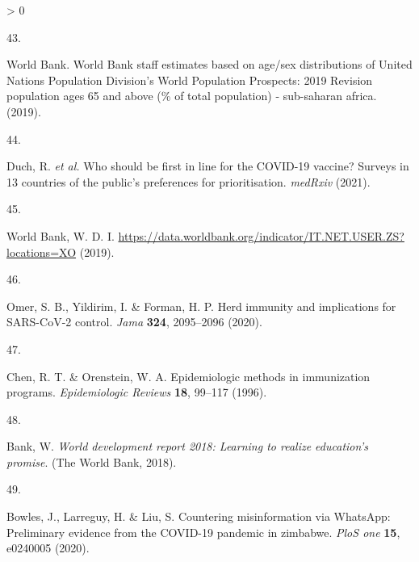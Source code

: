 \documentclass[
  12pt,
]{article}
\newlength{\cslhangindent}
\newlength{\csllabelwidth}
\newenvironment{CSLReferences}[2] %
 {%
  \setlength{\parindent}{0pt}
  \ifodd #1 \everypar{\setlength{\hangindent}{\cslhangindent}}\ignorespaces\fi
  \ifnum #2 > 0
  \setlength{\parskip}{#2\baselineskip}
  \fi
 }%
 {}
\newcommand{\CSLLeftMargin}[1]{\parbox[t]{\csllabelwidth}{#1}}
\newcommand{\CSLRightInline}[1]{\parbox[t]{\linewidth - \csllabelwidth}{#1}\break}
\providecommand{\DIFaddbegin}{} %
\providecommand{\DIFaddend}{} %
\providecommand{\DIFdelbegin}{} %
\providecommand{\DIFdelend}{} %
\newcommand{\DIFscaledelfig}{0.5}
\newlength{\DIFdelgraphicswidth} %
\newlength{\DIFdelgraphicsheight} %
\newcommand{\DIFaddincludegraphics}[2][]{{\color{blue}\fbox{\DIFOincludegraphics[#1]{#2}}}} %
\newcommand{\DIFdelincludegraphics}[2][]{%
\sbox{\DIFdelgraphicsbox}{\DIFOincludegraphics[#1]{#2}}%
\settoboxwidth{\DIFdelgraphicswidth}{\DIFdelgraphicsbox} %
\settoboxtotalheight{\DIFdelgraphicsheight}{\DIFdelgraphicsbox} %
\scalebox{\DIFscaledelfig}{%
\parbox[b]{\DIFdelgraphicswidth}{\usebox{\DIFdelgraphicsbox}\\[-\baselineskip] \rule{\DIFdelgraphicswidth}{0em}}\llap{\resizebox{\DIFdelgraphicswidth}{\DIFdelgraphicsheight}{%
\setlength{\unitlength}{\DIFdelgraphicswidth}%
\begin{picture}(1,1)%
\thicklines\linethickness{2pt} %
{\color[rgb]{1,0,0}\put(0,0){\framebox(1,1){}}}%
{\color[rgb]{1,0,0}\put(0,0){\line( 1,1){1}}}%
{\color[rgb]{1,0,0}\put(0,1){\line(1,-1){1}}}%
\end{picture}%
}\hspace*{3pt}}} %
} %
\DeclareRobustCommand{\DIFaddbegin}{\DIFOaddbegin \let\includegraphics\DIFaddincludegraphics} %
\DeclareRobustCommand{\DIFaddend}{\DIFOaddend \let\includegraphics\DIFOincludegraphics} %
\DeclareRobustCommand{\DIFdelbegin}{\DIFOdelbegin \let\includegraphics\DIFdelincludegraphics} %
\DeclareRobustCommand{\DIFdelend}{\DIFOaddend \let\includegraphics\DIFOincludegraphics} %
\begin{document}
\begin{CSLReferences}{0}{0}
\leavevmode\DIFaddbegin \hypertarget{ref-WorldBanksubSahara}{}%
\CSLLeftMargin{43. }
\CSLRightInline{World Bank. {World Bank staff estimates based on age/sex distributions of United Nations Population Division's World Population Prospects: 2019 Revision} population ages 65 and above (\% of total population) - sub-saharan africa. (2019).}

\leavevmode\hypertarget{ref-Duch2021}{}%
\CSLLeftMargin{44. }
\CSLRightInline{Duch, R. \emph{et al.} Who should be first in line for the COVID-19 vaccine? Surveys in 13 countries of the public{'}s preferences for prioritisation. \emph{medRxiv} (2021).}

\leavevmode\DIFaddend \hypertarget{ref-wbinternet}{}%
\DIFdelbegin %
\DIFdelend \DIFaddbegin \CSLLeftMargin{45. }
\DIFaddend \CSLRightInline{World Bank, W. D. I. \url{https://data.worldbank.org/indicator/IT.NET.USER.ZS?locations=XO} (2019).}

\DIFaddbegin \leavevmode\hypertarget{ref-omer2020herd}{}%
\CSLLeftMargin{46. }
\CSLRightInline{Omer, S. B., Yildirim, I. \& Forman, H. P. Herd immunity and implications for SARS-CoV-2 control. \emph{Jama} \textbf{324}, 2095--2096 (2020).}

\leavevmode\hypertarget{ref-chen1996}{}%
\CSLLeftMargin{47. }
\CSLRightInline{Chen, R. T. \& Orenstein, W. A. Epidemiologic methods in immunization programs. \emph{Epidemiologic Reviews} \textbf{18}, 99--117 (1996).}

\leavevmode\hypertarget{ref-world2017world}{}%
\CSLLeftMargin{48. }
\CSLRightInline{Bank, W. \emph{World development report 2018: Learning to realize education's promise}. (The World Bank, 2018).}

\leavevmode\hypertarget{ref-bowles2020countering}{}%
\CSLLeftMargin{49. }
\CSLRightInline{Bowles, J., Larreguy, H. \& Liu, S. Countering misinformation via WhatsApp: Preliminary evidence from the COVID-19 pandemic in zimbabwe. \emph{PloS one} \textbf{15}, e0240005 (2020).}

\DIFaddend \end{CSLReferences}

\newpage
\end{document}
